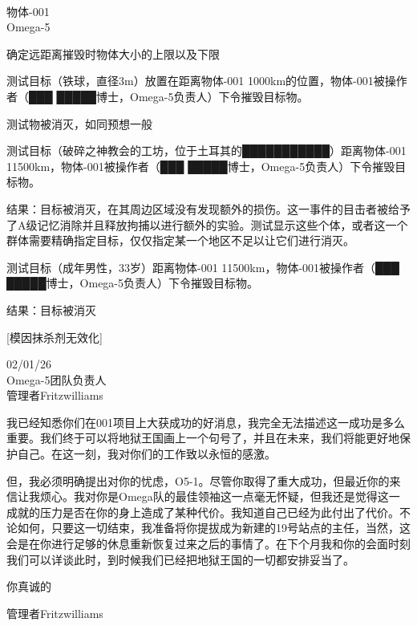\begin{scpboxbbwm}
\hr

 \\
物体-001 \\
Omega-5

确定远距离摧毁时物体大小的上限以及下限

测试目标（铁球，直径3m）放置在距离物体-001 1000km的位置，物体-001被操作者（███ █████博士，Omega-5负责人）下令摧毁目标物。

测试物被消灭，如同预想一般

测试目标（破碎之神教会的工坊，位于土耳其的███████████）距离物体-001 11500km，物体-001被操作者（███ █████博士，Omega-5负责人）下令摧毁目标物。

结果：目标被消灭，在其周边区域没有发现额外的损伤。这一事件的目击者被给予了A级记忆消除并且释放拘捕以进行额外的实验。测试显示这些个体，或者这一个群体需要精确指定目标，仅仅指定某一个地区不足以让它们进行消灭。

测试目标（成年男性，33岁）距离物体-001 11500km，物体-001被操作者（███ █████博士，Omega-5负责人）下令摧毁目标物。

结果：目标被消灭

\end{scpboxbbwm}




\begin{scpboxc}
{[模因抹杀剂无效化]}
\end{scpboxc}

\begin{scpbox}

02/01/26 \\
Omega-5团队负责人 \\
管理者Fritzwilliams

我已经知悉你们在001项目上大获成功的好消息，我完全无法描述这一成功是多么重要。我们终于可以将地狱王国画上一个句号了，并且在未来，我们将能更好地保护自己。在这一刻，我对你们的工作致以永恒的感激。

但，我必须明确提出对你的忧虑，O5-1。尽管你取得了重大成功，但最近你的来信让我烦心。我对你是Omega队的最佳领袖这一点毫无怀疑，但我还是觉得这一成就的压力是否在你的身上造成了某种代价。我知道自己已经为此付出了代价。不论如何，只要这一切结束，我准备将你提拔成为新建的19号站点的主任，当然，这会是在你进行足够的休息重新恢复过来之后的事情了。在下个月我和你的会面时刻我们可以详谈此时，到时候我们已经把地狱王国的一切都安排妥当了。

你真诚的

管理者Fritzwilliams

\end{scpbox}

